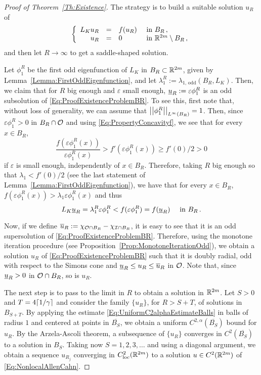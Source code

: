 \begin{proof}[Proof of Theorem~\ref{Th:Existence}]
	The strategy is to build a suitable solution $u_R$ of 
	\begin{equation}
	\label{Eq:ProofExistenceProblemBR}
	\left\{\begin{array}{rcll}
	L_K u_R &=& f(u_R) & \textrm{ in } B_R\,,\\
	u_R &=& 0 & \textrm{ in }\mathbb{R}^{2m} \setminus B_R\,,
	\end{array} \right.
	\end{equation}
	and then let $R\to \infty$ to get a saddle-shaped solution.
	
	Let $\phi_1^R$ be the first odd eigenfunction of $L_K$ in $B_R \subset \mathbb{R}^{2m}$, given by Lemma~\ref{Lemma:FirstOddEigenfunction}, and let  $\lambda_1^R := \lambda_{1, \, \mathrm{odd}}(B_R, L_K)$. Then, we claim that for $R$ big enough and $\varepsilon$ small enough, $\underline{u}_R:= \varepsilon\phi_1^R $ is an odd subsolution of \eqref{Eq:ProofExistenceProblemBR}. To see this, first note that, without loss of generality, we can assume that $\left | \left |{\phi_1^R} \right | \right |_{L^\infty(B_R)}=1$. Then, since $\varepsilon \phi_1^R>0$ in $B_R\cap \mathcal{O}$ and using \eqref{Eq:PropertyConcavityf}, we see that for every $x\in B_R$,
	$$
	\dfrac{f(\varepsilon \phi_1^R(x))}{\varepsilon \phi_1^R(x)} > f'(\varepsilon \phi_1^R(x)) \geq f'(0)/2 > 0
	$$
	if $\varepsilon$ is small enough, independently of $x\in B_R$. Therefore, taking $R$ big enough so that $\lambda_1 < f'(0)/2$ (see the last statement of Lemma~\ref{Lemma:FirstOddEigenfunction}), we have that for every $x\in B_R$,  $f(\varepsilon \phi_1^R(x)) > \lambda_1 \varepsilon \phi_1^R(x)$ and thus
	$$
	L_K \underline{u}_R = \lambda_1^R \varepsilon \phi_1^R < f(\varepsilon\phi_1^R) = f(\underline{u}_R) \quad \textrm{ in } B_R\,.
	$$
	
	Now, if we define $\overline{u}_R := \chi_{\mathcal{O} \cap B_R} - \chi_{\mathcal{I} \cap B_R}$, it is easy to see that it is an odd supersolution of \eqref{Eq:ProofExistenceProblemBR}. Therefore, using the monotone iteration procedure (see Proposition~\ref{Prop:MonotoneIterationOdd}), we obtain a solution $u_R$ of \eqref{Eq:ProofExistenceProblemBR} such that it is doubly radial, odd with respect to the Simons cone and $\underline{u}_R \leq u_R \leq \overline{u}_R$ in $\mathcal{O}$. Note that, since $\underline{u}_R > 0$ in $\mathcal{O} \cap B_R$, so is $u_R$.
	
	The next step is to pass to the limit in $R$ to obtain a solution in $\mathbb{R}^{2m}$. Let $S>0$ and $T =4\lceil 1/\gamma\rceil$ and consider the family $\{u_R\}$, for $R> S + T$, of solutions in $B_{S+T}$. By applying the estimate \eqref{Eq:UniformC2alphaEstimateBalls} in balls of radius $1$ and centered at points in $\overline{B_{S}}$, we obtain a uniform $C^{2,\alpha}(\overline{B_S})$ bound for $u_R$. By the Arzela-Ascoli theorem, a subsequence of $\{u_R\}$ converges in $C^2(\overline{B_S})$ to a solution in $B_S$. Taking now $S = 1,2,3,\ldots$ and using a diagonal argument, we obtain a sequence $u_{R_j}$ converging in $C^2_{\mathrm{loc}}(\mathbb{R}^{2m})$ to a solution $u \in C^2(\mathbb{R}^{2m})$ of \eqref{Eq:NonlocalAllenCahn}.
	

\end{proof}

